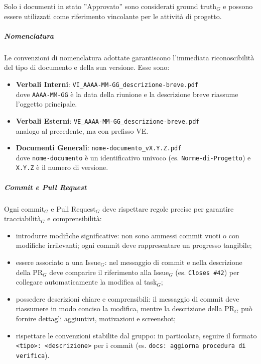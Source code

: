 \documentclass[a4paper, 10pt]{article}
\begin{document}
Solo i documenti in stato ''Approvato'' sono considerati ground truth$_G$ e possono essere utilizzati come riferimento vincolante per le attività di progetto.

\subparagraph{Nomenclatura}

Le convenzioni di nomenclatura adottate garantiscono l'immediata riconoscibilità del tipo di documento e della sua versione. Esse sono:

\begin{itemize}
    \item \textbf{Verbali Interni}: \texttt{VI\_AAAA-MM-GG\_descrizione-breve.pdf}\\
    dove \texttt{AAAA-MM-GG} è la data della riunione e la descrizione breve riassume l'oggetto principale.
    \item \textbf{Verbali Esterni}: \texttt{VE\_AAAA-MM-GG\_descrizione-breve.pdf}\\
    analogo al precedente, ma con prefisso VE.
    \item \textbf{Documenti Generali}: \texttt{nome-documento\_vX.Y.Z.pdf}\\
    dove \texttt{nome-documento} è un identificativo univoco (es. \texttt{Norme-di-Progetto}) e \texttt{X.Y.Z} è il numero di versione.
\end{itemize}

\subparagraph{Commit e Pull Request}

Ogni commit$_G$ e Pull Request$_G$ deve rispettare regole precise per garantire tracciabilità$_G$ e comprensibilità:
\begin{itemize}
    \item introdurre modifiche significative: non sono ammessi commit vuoti o con modifiche irrilevanti; ogni commit deve rappresentare un progresso tangibile;
    \item essere associato a una Issue$_G$: nel messaggio di commit e nella descrizione della PR$_G$ deve comparire il riferimento alla Issue$_G$ (es. \texttt{Closes \#42}) per collegare automaticamente la modifica al task$_G$;
    \item possedere descrizioni chiare e comprensibili: il messaggio di commit deve riassumere in modo conciso la modifica, mentre la descrizione della PR$_G$ può fornire dettagli aggiuntivi, motivazioni e screenshot;
    \item rispettare le convenzioni stabilite dal gruppo: in particolare, seguire il formato \texttt{<tipo>: <descrizione>} per i commit (es. \texttt{docs: aggiorna procedura di verifica}).
\end{itemize}
\end{document}
